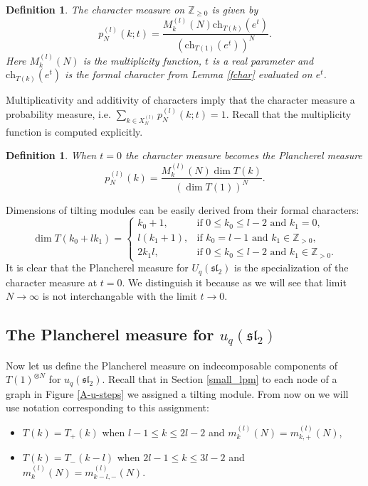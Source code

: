 \documentclass[11pt]{amsart}
\newcommand\lie[1]{\mathfrak{#1}}
\newcommand{\Z}{\mathbb{Z}}
\newtheorem{definition}[theorem]{Definition}
\begin{document}
\begin{definition} The character measure on  $\Z_{\geq 0}$ is given by
\begin{equation*}
p^{(l)}_N(k;t)=\frac{M^{(l)}_{k}(N)\mathrm{ch}_{T(k)}(e^t)}{(\mathrm{ch}_{T(1)}(e^t))^N}.
\end{equation*}
Here $M^{(l)}_{k}(N)$ is the multiplicity function, $t$ is a real parameter and $\mathrm{ch}_{T(k)}(e^t)$ is
the formal character from Lemma \ref{fchar} evaluated on $e^t$. 
\end{definition}

Multiplicativity and additivity of characters imply that the character measure a probability measure, i.e. $\sum\limits_{k\in X^{(l)}_N} p^{(l)}_N(k;t)=1$. Recall that the multiplicity function is computed explicitly.
\begin{definition}\label{planchdef}
When $t=0$ the character measure becomes the Plancherel measure 
\begin{equation*}
p^{(l)}_N(k)=\frac{M^{(l)}_{k}(N)\dim T(k)}{(\dim  T(1))^N}.
\end{equation*}
\end{definition}

Dimensions of tilting modules can be easily derived from their formal characters:
\begin{equation*}
\dim T(k_0+lk_1)=
\begin{cases}
k_0+1,&\text{if $0\leq k_0\leq l-2$ and $k_1=0$,}\\
l(k_1+1), & \text{if $k_0=l-1$ and $k_1\in\mathbb{Z}_{>0}$,}\\
2k_1l,&\text{if $0\leq k_0\leq l-2$ and $k_1\in\mathbb{Z}_{>0}$.}
\end{cases}
\end{equation*}
It is clear that the Plancherel measure for $U_q(\lie{sl}_2)$ is the specialization of the character measure at $t=0$. We distinguish it because as we will see that limit $N\to \infty$ is not interchangable with the limit $t\to 0$.



\subsection{The Plancherel measure for  $u_q(\lie{sl}_2)$}\label{secplanch}
Now let us define the Plancherel measure on indecomposable components 
of $T(1)^{\otimes N}$ for $u_q(\lie{sl}_2)$. Recall that in Section \ref{small_lpm} to each node of a graph in Figure \ref{A-u-steps} we assigned a tilting module. From now on we will use notation corresponding to this assignment:
\begin{itemize}
    \item $T(k)=T_+(k)$ when $l-1 \leq k\leq 2l-2$ and $m^{(l)}_{k}(N)=m^{(l)}_{k, +}(N)$,
    \item $T(k)=T_-(k-l)$ when $2l-1 \leq k\leq 3l-2$ and $m^{(l)}_{k}(N)=m^{(l)}_{k-l, -}(N)$.
\end{itemize}
\end{document}
